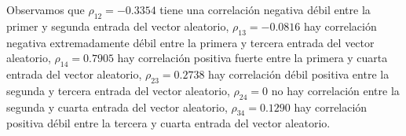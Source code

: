 Observamos que $\rho_{12} = -0.3354$ tiene una correlación negativa débil entre la primer y segunda entrada del vector aleatorio, $\rho_{13}=-0.0816$ hay correlación negativa extremadamente débil entre la primera y tercera entrada del vector aleatorio, $\rho_{14}=0.7905$ hay correlación positiva fuerte entre la primera y cuarta entrada del vector aleatorio, $\rho_{23}=0.2738$ hay correlación débil positiva entre la segunda y tercera entrada del vector aleatorio, $\rho_{24}=0$ no hay correlación entre la segunda y cuarta entrada del vector aleatorio, $\rho_{34}=0.1290$ hay correlación positiva débil entre la tercera y cuarta entrada del vector aleatorio.
